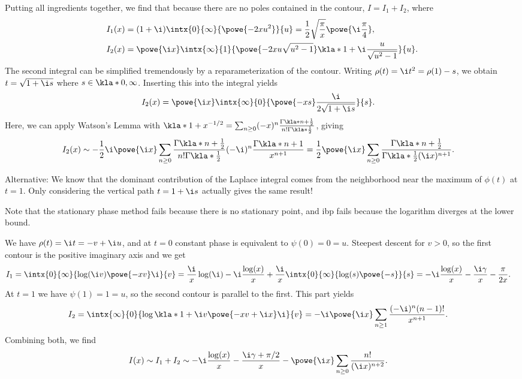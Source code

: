 \documentclass[english, parskip=full]{scrbook}
\newcommand{\note}[1]{\begin{tcolorbox}[colback=colorbackgroundnote,colframe=colornote, breakable,enhanced]#1\end{tcolorbox}}
\newcommand{\example}[3]{\begin{tcolorbox}[colback=colorbackgroundexample,colframe=colorexample, breakable,enhanced,title={\textbf{#1}: #2.}]#3\end{tcolorbox}}
\begin{document}
{Putting all ingredients together, we find that because there are no poles contained in the contour, $I=I_1+I_2$, where
\begin{align}
I_1(x) &= (1+\i) \intx{0}{\infty}{\powe{-2xu^2}}{u} = \frac{1}{2} \sqrt{\frac{\pi}{x}} \powe{\i\frac{\pi}{4}},\\
I_2(x) &= \powe{\i x} \intx{\infty}{1}{\powe{-2xu\sqrt{u^2-1}} \kla*{1 + \i \frac{u}{\sqrt{u^2-1}}} }{u}.
\end{align}%
The second integral can be simplified tremendously by a reparameterization of the contour.
Writing $\rho(t) = \i t^2 = \rho(1) - s$, we obtain $t = \sqrt{1 + \i s}$ where $s\in\kla*{0,\infty}$.
Inserting this into the integral yields
\begin{align}
I_2(x) &= \powe{\i x} \intx{\infty}{0}{\powe{-xs} \frac{\i}{2\sqrt{1 + \i s}}}{s}.
\end{align}
Here, we can apply Watson's Lemma with $\kla*{1+x}^{-1/2} = \sum_{n\ge 0} (-x)^n \frac{\Gamma\kla*{n+\frac{1}{2}}}{n! \Gamma\kla*{\frac{1}{2}}}$, giving
\begin{align}
I_2(x) &\sim -\frac{1}{2} \i \powe{\i x} \sum_{n\ge 0} \frac{\Gamma\kla*{n+\frac{1}{2}}}{n! \Gamma\kla*{\frac{1}{2}}} (-\i)^n \frac{\Gamma\kla*{n+1}}{x^{n+1}} = \frac{1}{2} \powe{\i x} \sum_{n\ge 0} \frac{\Gamma\kla*{n+\frac{1}{2}}}{\Gamma\kla*{\frac{1}{2}} (\i x)^{n+1}}.
\end{align}
\note{Alternative: We know that the dominant contribution of the Laplace integral comes from the neighborhood near the maximum of $\phi(t)$ at $t=1$.
Only considering the vertical path $t=1+\i s$ actually gives the same result!}
}
\example{Logarithmic Integral}{$I(x) = \intx{0}{1}{\log(t)\powe{\i xt}}{t}$ as $x\rightarrow\infty$}{Note that the stationary phase method fails because there is no stationary point, and \gls{ibp} fails because the logarithm diverges at the lower bound.

We have $\rho(t)=\i t = -v+\i u$, and at $t=0$ constant phase is equivalent to $\psi(0)=0=u$.
Steepest descent for $v>0$, so the first contour is the positive imaginary axis and we get
\begin{align}
I_1 &= \intx{0}{\infty}{\log(\i v)\powe{- xv} \i}{v} = \frac{\i}{x} \log(\i) - \i \frac{\log(x)}{x} + \frac{\i}{x} \intx{0}{\infty}{\log(s)\powe{-s}}{s} = -\i \frac{\log(x)}{x} - \frac{\i\gamma}{x} - \frac{\pi}{2x}.
\end{align}
At $t=1$ we have $\psi(1)=1=u$, so the second contour is parallel to the first.
This part yields
\begin{align}
I_2 &= \intx{\infty}{0}{\log\kla*{1 + \i v} \powe{-xv + \i x} \i}{v} = -\i\powe{\i x} \sum_{n\ge 1} \frac{(-\i)^n (n-1)!}{x^{n+1}}.
\end{align}
Combining both, we find
\begin{align}
I(x) &\sim I_1+I_2 \sim -\i \frac{\log(x)}{x} - \frac{\i\gamma + \pi/2}{x} - \powe{\i x} \sum_{n\ge 0} \frac{n!}{(\i x)^{n+2}}.
\end{align}
}
\end{document}
